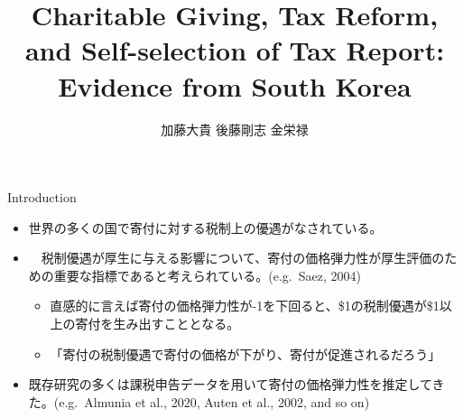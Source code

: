 \documentclass[dvipdfmx,10pt]{beamer}
\begin{document}
	\author{加藤大貴
		後藤剛志
		金栄禄}
	\title{Charitable Giving, Tax Reform, and Self-selection of Tax Report:
		Evidence from South Korea}
	\begin{frame}[plain]
		\maketitle
	\end{frame}
	
	\begin{frame}{Introduction}
		\protect\hypertarget{introduction}{}
		\begin{itemize}
			\item 世界の多くの国で寄付に対する税制上の優遇がなされている。
			\item　税制優遇が厚生に与える影響について、寄付の価格弾力性が厚生評価のための重要な指標であると考えられている。(e.g.~Saez, 2004)
			\begin{itemize}
				\item 直感的に言えば寄付の価格弾力性が-1を下回ると、\$1の税制優遇が\$1以上の寄付を生み出すこととなる。
				\item 「寄付の税制優遇で寄付の価格が下がり、寄付が促進されるだろう」
			\end{itemize}
			\item 既存研究の多くは課税申告データを用いて寄付の価格弾力性を推定してきた。(e.g.~Almunia et al., 2020, Auten et al., 2002, and so on)
		\end{itemize}
	\end{frame}
	
\end{document}
